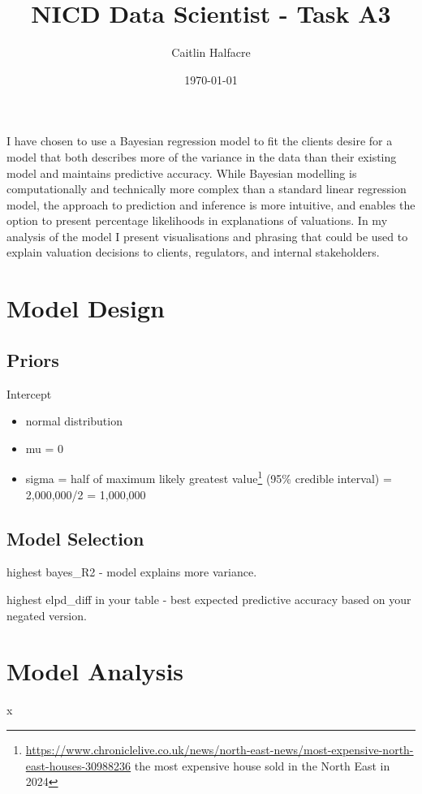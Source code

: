 \documentclass{scrartcl}
\author{Caitlin Halfacre}
\date{\today}
\title{NICD Data Scientist - Task A3}
\begin{document}
\maketitle
I have chosen to use a Bayesian regression model to fit the clients desire for a model that both describes more of the variance in the data than their existing model and maintains predictive accuracy. While Bayesian modelling is computationally and technically more complex than a standard linear regression model, the approach to prediction and inference is more intuitive, and enables the option to present percentage likelihoods in explanations of valuations. In my analysis of the model I present visualisations and phrasing that could be used to explain valuation decisions to clients, regulators, and internal stakeholders.

\section{Model Design}
\subsection{Priors}
Intercept
\begin{itemize}
	\item normal distribution
	\item mu = 0
	\item sigma = half of maximum likely greatest value\footnote{\url{https://www.chroniclelive.co.uk/news/north-east-news/most-expensive-north-east-houses-30988236} the most expensive house sold in the North East in 2024} (95\% credible interval) = 2,000,000/2 = 1,000,000
	
	
\end{itemize}

\subsection{Model Selection}
highest bayes\_R2 - model explains more variance.

highest elpd\_diff in your table - best expected predictive accuracy based on your negated version.

\section{Model Analysis}
x
\end{document}
